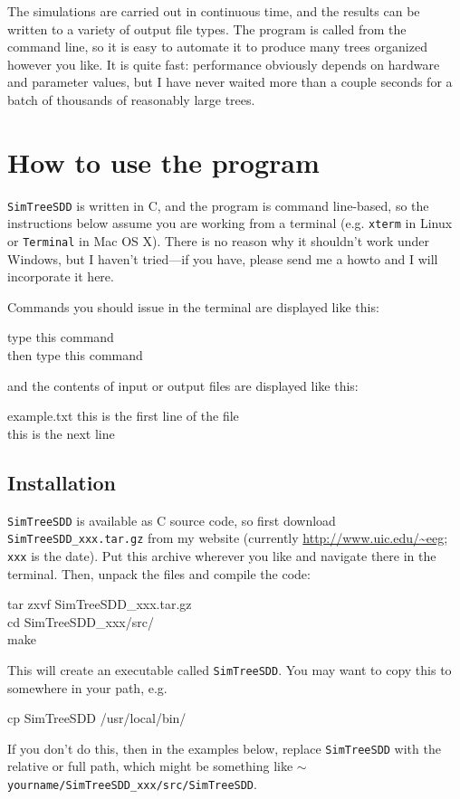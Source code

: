 \documentclass[10pt]{article}
\begin{document}
The simulations are carried out in continuous time, and the results can be written to a variety of output file types.
The program is called from the command line, so it is easy to automate it to produce many trees organized however you like.
It is quite fast: performance obviously depends on hardware and parameter values, but I have never waited more than a couple seconds for a batch of thousands of reasonably large trees.


\section*{How to use the program}

\texttt{SimTreeSDD} is written in C, and the program is command line-based, so the instructions below assume you are working from a terminal (e.g. \texttt{xterm} in Linux or \texttt{Terminal} in Mac OS X).
There is no reason why it shouldn't work under Windows, but I haven't tried---if you have, please send me a howto and I will incorporate it here.

Commands you should issue in the terminal are displayed like this:
\begin{commandis}
	type this command \\
	then type this command
\end{commandis}
and the contents of input or output files are displayed like this:
\begin{filesays}{example.txt}
	this is the first line of the file \\
	this is the next line
\end{filesays}


\subsection*{Installation}

\texttt{SimTreeSDD} is available as C source code, so first download \texttt{SimTreeSDD\_xxx.tar.gz} from my website (currently \url{http://www.uic.edu/~eeg}; \texttt{xxx} is the date).
Put this archive wherever you like and navigate there in the terminal.
Then, unpack the files and compile the code:
\begin{commandis}
	tar zxvf SimTreeSDD\_xxx.tar.gz	\\
	cd SimTreeSDD\_xxx/src/		\\
	make
\end{commandis}
This will create an executable called \texttt{SimTreeSDD}.
You may want to copy this to somewhere in your path, e.g.
\begin{commandis}
	cp SimTreeSDD /usr/local/bin/
\end{commandis}
If you don't do this, then in the examples below, replace \texttt{SimTreeSDD} with the relative or full path, which might be something like \texttt{$\sim$yourname/SimTreeSDD\_xxx/src/SimTreeSDD}.
\end{document}
